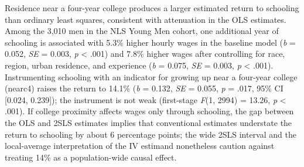 Residence near a four-year college produces a larger estimated return to schooling than ordinary least squares, consistent with attenuation in the OLS estimates. Among the 3,010 men in the NLS Young Men cohort, one additional year of schooling is associated with 5.3\% higher hourly wages in the baseline model (\textit{b} = 0.052, \textit{SE} = 0.003, \textit{p} < .001) and 7.8\% higher wages after controlling for race, region, urban residence, and experience (\textit{b} = 0.075, \textit{SE} = 0.003, \textit{p} < .001). Instrumenting schooling with an indicator for growing up near a four-year college (nearc4) raises the return to 14.1\% (\textit{b} = 0.132, \textit{SE} = 0.055, \textit{p} = .017, 95\% CI [0.024, 0.239]); the instrument is not weak (first-stage \textit{F}(1, 2994) = 13.26, \textit{p} < .001). If college proximity affects wages only through schooling, the gap between the OLS and 2SLS estimates implies that conventional estimates understate the return to schooling by about 6 percentage points; the wide 2SLS interval and the local-average interpretation of the IV estimand nonetheless caution against treating 14\% as a population-wide causal effect.

